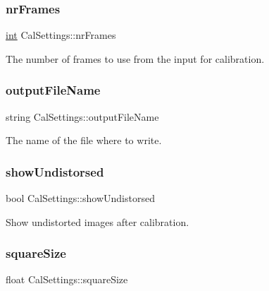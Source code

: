 \mbox{\label{class_cal_settings_a952a1f99909768b2af2580b9be94ce9d}} 
\subsubsection{\texorpdfstring{nrFrames}{nrFrames}}
{\footnotesize\ttfamily \mbox{\hyperlink{draw_8hh_aa620a13339ac3a1177c86edc549fda9b}{int}} Cal\+Settings\+::nr\+Frames}



The number of frames to use from the input for calibration. 

\mbox{\label{class_cal_settings_a9ea48b7c35d4bba18320d3635a333936}} 
\subsubsection{\texorpdfstring{outputFileName}{outputFileName}}
{\footnotesize\ttfamily string Cal\+Settings\+::output\+File\+Name}



The name of the file where to write. 

\mbox{\label{class_cal_settings_a3c70a81781bda96826362983a3a78bf2}} 
\subsubsection{\texorpdfstring{showUndistorsed}{showUndistorsed}}
{\footnotesize\ttfamily bool Cal\+Settings\+::show\+Undistorsed}



Show undistorted images after calibration. 

\mbox{\label{class_cal_settings_a14597574ec3d7c1a4d5f3cb9e555b887}} 
\subsubsection{\texorpdfstring{squareSize}{squareSize}}
{\footnotesize\ttfamily float Cal\+Settings\+::square\+Size}



